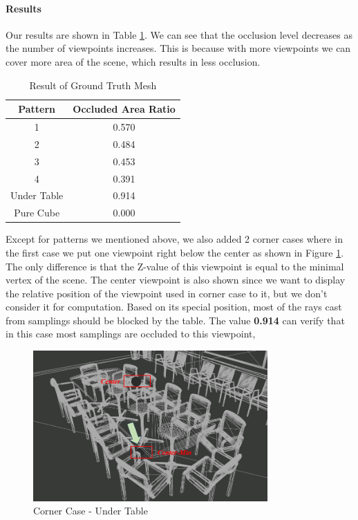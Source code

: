 \documentclass[11pt, a4paper,oneside,chapterprefix=false]{scrbook}
\begin{document}
\paragraph{Results}

Our results are shown in Table \ref{tab:result of each experiment}. We can see that the occlusion level decreases as the number of viewpoints increases. This is because with more viewpoints we can cover more area of the scene, which results in less occlusion.

\begin{table}[h]
    \centering
    \begin{tabular}{|c|c|}
        \hline
        \textbf{Pattern} & \textbf{Occluded Area Ratio} \\
        \hline
        1 & 0.570 \\
        2 & 0.484 \\
		3 & 0.453 \\
		4 & 0.391 \\
        Under Table & 0.914 \\
        Pure Cube & 0.000 \\

        \hline
    \end{tabular}
    \caption{Result of Ground Truth Mesh}
    \label{tab:result of each experiment}
\end{table}

Except for patterns we mentioned above, we also added 2 corner cases where in the first case we put one viewpoint right below the center as shown in Figure \ref{fig:corner case under table}. The only difference is that the Z-value of this viewpoint is equal to the minimal vertex of the scene. The center viewpoint is also shown since we want to display the relative position of the viewpoint used in corner case to it, but we don't consider it for computation. Based on its special position, most of the rays cast from samplings should be blocked by the table. The value \textbf{0.914} can verify that in this case most samplings are occluded to this viewpoint, 

\begin{figure}[H]
    \centering
    \includegraphics*[width=0.8\textwidth]{figures/edge case-under table.png}
    \caption{Corner Case - Under Table}
    \label{fig:corner case under table}
\end{figure}
\end{document}
